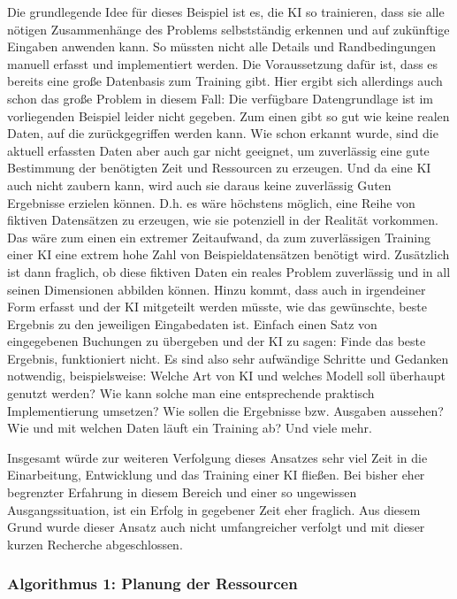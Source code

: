 Die grundlegende Idee für dieses Beispiel ist es, die KI so trainieren, dass sie alle nötigen Zusammenhänge des Problems selbstständig erkennen und auf zukünftige Eingaben anwenden kann. So müssten nicht alle Details und Randbedingungen manuell erfasst und implementiert werden. Die Voraussetzung dafür ist, dass es bereits eine große Datenbasis zum Training gibt. Hier ergibt sich allerdings auch schon das große Problem in diesem Fall: Die verfügbare Datengrundlage ist im vorliegenden Beispiel leider nicht gegeben. Zum einen gibt so gut wie keine realen Daten, auf die zurückgegriffen werden kann. Wie schon erkannt wurde, sind die aktuell erfassten Daten aber auch gar nicht geeignet, um zuverlässig eine gute Bestimmung der benötigten Zeit und Ressourcen zu erzeugen. Und da eine KI auch nicht zaubern kann, wird auch sie daraus keine zuverlässig Guten Ergebnisse erzielen können. D.h. es wäre höchstens möglich, eine Reihe von fiktiven Datensätzen zu erzeugen, wie sie potenziell in der Realität vorkommen. Das wäre zum einen ein extremer Zeitaufwand, da zum zuverlässigen Training einer KI eine extrem hohe Zahl von Beispieldatensätzen benötigt wird. Zusätzlich ist dann fraglich, ob diese fiktiven Daten ein reales Problem zuverlässig und in all seinen Dimensionen abbilden können. Hinzu kommt, dass auch in irgendeiner Form erfasst und der KI mitgeteilt werden müsste, wie das gewünschte, beste Ergebnis zu den jeweiligen Eingabedaten ist. Einfach einen Satz von eingegebenen Buchungen zu übergeben und der KI zu sagen: \glqq{}Finde das beste Ergebnis\grqq{}, funktioniert nicht. Es sind also sehr aufwändige Schritte und Gedanken notwendig, beispielsweise: Welche Art von KI und welches Modell soll überhaupt genutzt werden? Wie kann solche man eine entsprechende praktisch Implementierung umsetzen? Wie sollen die Ergebnisse bzw. Ausgaben aussehen? Wie und mit welchen Daten läuft ein Training ab? Und viele mehr. \cite{KIverstehen}

Insgesamt würde zur weiteren Verfolgung dieses Ansatzes sehr viel Zeit in die Einarbeitung, Entwicklung und das Training einer KI fließen. Bei bisher eher begrenzter Erfahrung in diesem Bereich und einer so ungewissen Ausgangssituation, ist ein Erfolg in gegebener Zeit eher fraglich. Aus diesem Grund wurde dieser Ansatz auch nicht umfangreicher verfolgt und mit dieser kurzen Recherche abgeschlossen.

\subsubsection{Algorithmus 1: Planung der Ressourcen}


